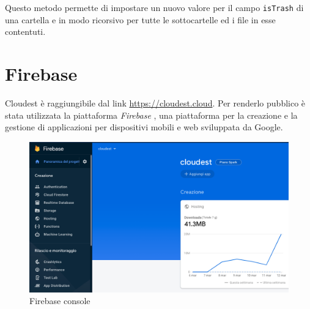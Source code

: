 \documentclass{article}
\begin{document}
Questo metodo permette di impostare un nuovo valore per il campo \texttt{isTrash} di una cartella e in modo ricorsivo per tutte le sottocartelle ed i file in esse contentuti.

\newpage

\section{Firebase}
Cloudest è raggiungibile dal link \href{https://cloudest.cloud}{https://cloudest.cloud}. Per renderlo pubblico è stata utilizzata la piattaforma \textit{Firebase} \cite{firebase}, una piattaforma per la creazione e la gestione di applicazioni per dispositivi mobili e web sviluppata da Google.

\begin{figure}[!ht]
  \includegraphics[width=16cm]{images/firebase.png}
  \centering
  \caption{Firebase console}
  \label{fig:firebase}
\end{figure}
\end{document}
